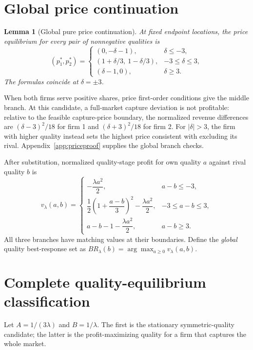 \documentclass[11pt]{article}
\newtheorem{lemma}{Lemma}
\begin{document}
\section{Global price continuation}\label{sec:price}
\begin{lemma}[Global pure price continuation]\label{lem:price}
At fixed endpoint locations, the price equilibrium for
every pair of nonnegative qualities is
\begin{equation}\label{eq:prices}
(p_1^*,p_2^*)=
\begin{cases}
(0,-\delta-1),&\delta\leq-3,\\
(1+\delta/3,\ 1-\delta/3),&-3\leq\delta\leq3,\\
(\delta-1,0),&\delta\geq3.
\end{cases}
\end{equation}
The formulas coincide at $\delta=\pm3$.
\end{lemma}
When both firms serve positive shares, price
first-order conditions give the middle branch.
At this candidate, a full-market capture deviation
is not profitable: relative to the feasible
capture-price boundary, the normalized revenue
differences are $(\delta-3)^2/18$ for firm 1 and
$(\delta+3)^2/18$ for firm 2. For $|\delta|>3$,
the firm with higher quality instead sets the
highest price consistent with excluding its rival.
Appendix~\ref{app:priceproof} supplies the
global branch checks.

After substitution, normalized quality-stage profit
for own quality $a$ against rival quality $b$ is
\begin{equation}\label{eq:payoff}
v_\lambda(a,b)=
\begin{cases}
-\dfrac{\lambda a^2}{2},&a-b\leq-3,\\[4pt]
\dfrac12\left(1+\dfrac{a-b}{3}\right)^2
-\dfrac{\lambda a^2}{2},&-3\leq a-b\leq3,\\[6pt]
a-b-1-\dfrac{\lambda a^2}{2},&a-b\geq3.
\end{cases}
\end{equation}
All three branches have matching values at
their boundaries. Define the \emph{global}
quality best-response set as
$BR_\lambda(b)=\arg\max_{a\geq0}v_\lambda(a,b)$.

\section{Complete quality-equilibrium classification}
\label{sec:results}
Let $A=1/(3\lambda)$ and $B=1/\lambda$.
The first is the stationary symmetric-quality
candidate; the latter is the profit-maximizing
quality for a firm that captures the whole market.
\end{document}
